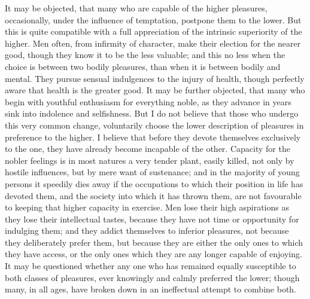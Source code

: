 It may be objected, that many who are capable of the higher pleasures,
occasionally, under the influence of temptation, postpone them to the
lower. But this is quite compatible with a full appreciation of the
intrinsic superiority of the higher. Men often, from infirmity of
character, make their election for the nearer good, though they know
it to be the less valuable; and this no less when the choice is
between two bodily pleasures, than when it is between bodily and
mental. They pursue sensual indulgences to the injury of health,
though perfectly aware that health is the greater good. It may be
further objected, that many who begin with youthful enthusiasm for
everything noble, as they advance in years sink into indolence and
selfishness. But I do not believe that those who undergo this very
common change, voluntarily choose the lower description of pleasures
in preference to the higher. I believe that before they devote
themselves exclusively to the one, they have already  become
incapable of the other. Capacity for the nobler feelings is in most
natures a very tender plant, easily killed, not only by hostile
influences, but by mere want of sustenance; and in the majority of
young persons it speedily dies away if the occupations to which their
position in life has devoted them, and the society into which it has
thrown them, are not favourable to keeping that higher capacity in
exercise. Men lose their high aspirations as they lose their
intellectual tastes, because they have not time or opportunity for
indulging them; and they addict themselves to inferior pleasures,
not because they deliberately prefer them, but because they are either
the only ones to which they have access, or the only ones which they
are any longer capable of enjoying. It may be questioned whether any
one who has remained equally susceptible to both classes of pleasures,
ever knowingly and calmly preferred the lower; though many, in all
ages, have broken down in an ineffectual attempt to combine both.

